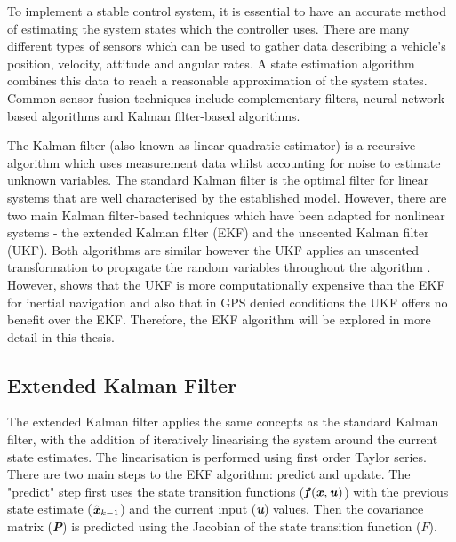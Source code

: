 

To implement a stable control system, it is essential to have an accurate method of estimating the system states which the controller uses. There are many different types of sensors which can be used to gather data describing a vehicle's position, velocity, attitude and angular rates. A state estimation algorithm combines this data to reach a reasonable approximation of the system states. Common sensor fusion techniques include complementary filters, neural network-based algorithms and Kalman filter-based algorithms. 

The Kalman filter (also known as linear quadratic estimator) is a recursive algorithm which uses measurement data whilst accounting for noise to estimate unknown variables. The standard Kalman filter is the optimal filter for linear systems that are well characterised by the established model. However, there are two main Kalman filter-based techniques which have been adapted for nonlinear systems - the extended Kalman filter (EKF) and the unscented Kalman filter (UKF). Both algorithms are similar however the UKF applies an unscented transformation to propagate the random variables throughout the algorithm \cite{Wana}. However, \cite{StPierre} shows that the UKF is more computationally expensive than the EKF for inertial navigation and also that in GPS denied conditions the UKF offers no benefit over the EKF. Therefore, the EKF algorithm will be explored in more detail in this thesis.
\subsection{Extended Kalman Filter}\label{section:EKFBackground}

The extended Kalman filter applies the same concepts as the standard Kalman filter, with the addition of iteratively linearising the system around the current state estimates. The linearisation is performed using first order Taylor series. There are two main steps to the EKF algorithm: predict and update.
The "predict" step first uses the state transition functions ($\textbf{\textit{f}}(\textbf{\textit{x}},\textbf{\textit{u}})$) with the previous state estimate ($\hat{\textbf{\textit{x}}}_{k-1}$) and the current input (\textbf{\textit{u}}) values. Then the covariance matrix (\textbf{\textit{P}}) is predicted using the Jacobian of the state transition function ($F$).

